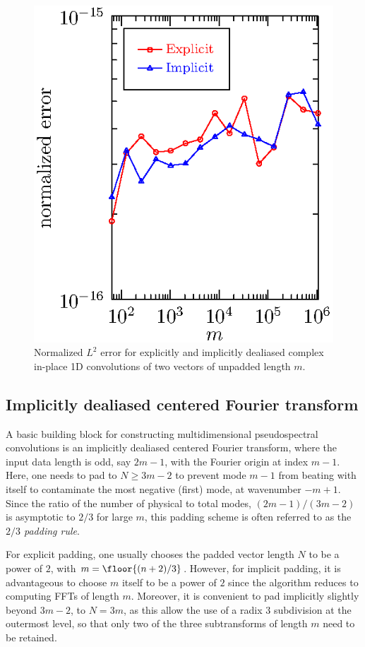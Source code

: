 \documentclass[final]{siamltex}
\begin{document}
\begin{figure}[htbp]
\begin{minipage}{0.49\linewidth}
\begin{center}
\includegraphics{error1c}
\caption{Normalized $L^2$ error for explicitly and implicitly
dealiased complex in-place 1D convolutions of two vectors of
unpadded length $m$.}
\label{error1c}
\end{center}
\end{minipage}
\end{figure}

\subsection{Implicitly dealiased centered Fourier transform}\label{fft0}
A basic building block for constructing multidimensional pseudospectral
convolutions is an implicitly dealiased centered Fourier transform, where the
input data length is odd, say $2m-1$, with the Fourier origin at index $m-1$. 
Here, one needs to pad to $N\ge 3m-2$ to prevent 
mode $m-1$ from beating with itself to contaminate the most negative
(first) mode, at wavenumber $-m+1$. Since the ratio of the number of physical to
total modes, $(2m-1)/(3m-2)$ is asymptotic to $2/3$ for large $m$, this
padding scheme is often referred to as the {\it $2/3$ padding rule}.

For explicit padding, one usually chooses the padded vector length
$N$ to be a power of $2$, with $m=\floor{(n+2)/3}$.
However, for implicit
padding, it is advantageous to choose $m$ itself to be a power of $2$
since the algorithm reduces to computing FFTs of length $m$.
Moreover, it is convenient to pad implicitly slightly beyond $3m-2$, to $N=3m$,
as this allow the use of a radix $3$ subdivision at the outermost level, so
that only two of the three subtransforms of length $m$ need to be retained. 
\end{document}
